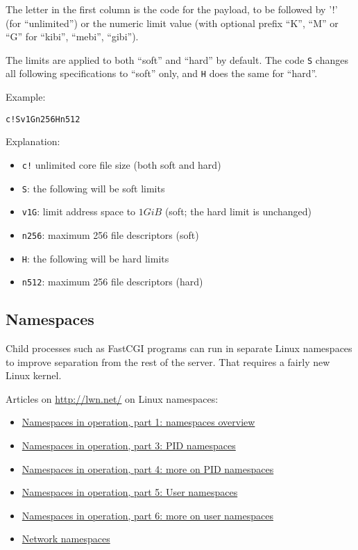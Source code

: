 \documentclass[a4paper,12pt]{article}
\begin{document}
The letter in the first column is the code for the payload, to be
followed by '!' (for ``unlimited'') or the numeric limit value (with
optional prefix ``K'', ``M'' or ``G'' for ``kibi'', ``mebi'',
``gibi'').

The limits are applied to both ``soft'' and ``hard'' by default.  The
code \texttt{S} changes all following specifications to ``soft'' only,
and \texttt{H} does the same for ``hard''.

Example:

\begin{verbatim}
c!Sv1Gn256Hn512
\end{verbatim}

Explanation:

\begin{itemize}
\item \verb|c!| unlimited core file size (both soft and hard)
\item \verb|S|: the following will be soft limits
\item \verb|v1G|: limit address space to $1 GiB$ (soft; the hard limit
  is unchanged)
\item \verb|n256|: maximum 256 file descriptors (soft)
\item \verb|H|: the following will be hard limits
\item \verb|n512|: maximum 256 file descriptors (hard)
\end{itemize}

\subsection{Namespaces}
\label{ns}

Child processes such as FastCGI programs can run in separate Linux
namespaces to improve separation from the rest of the server.  That
requires a fairly new Linux kernel.

Articles on \url{http://lwn.net/} on Linux namespaces:

\begin{itemize}
\item \href{https://lwn.net/Articles/531114/}{Namespaces in operation,
  part 1: namespaces overview}
\item \href{http://lwn.net/Articles/531419/}{Namespaces in operation,
  part 3: PID namespaces}
\item \href{http://lwn.net/Articles/532748/}{Namespaces in operation,
  part 4: more on PID namespaces}
\item \href{http://lwn.net/Articles/532593/}{Namespaces in operation,
  part 5: User namespaces}
\item \href{https://lwn.net/Articles/540087/}{Namespaces in operation,
  part 6: more on user namespaces}
\item \href{http://lwn.net/Articles/219794/}{Network namespaces}
\end{itemize}
\end{document}
